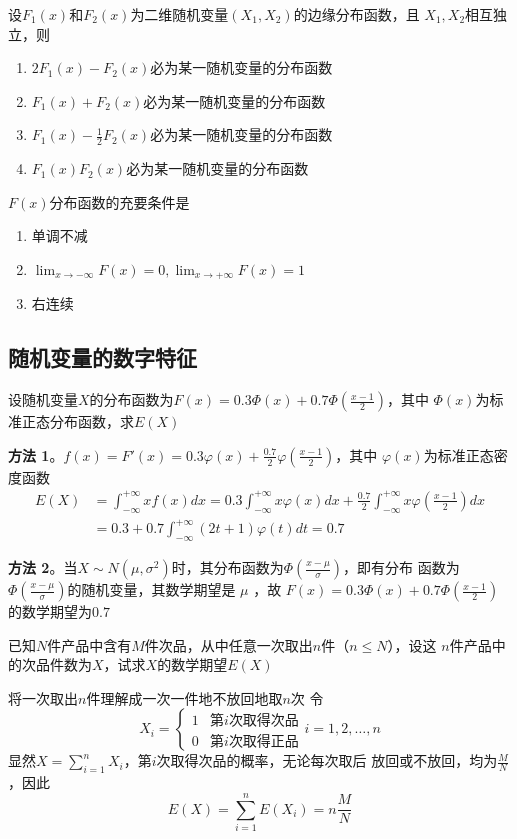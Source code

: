 \documentclass{article}
\begin{document}
\begin{examplle}[]
设\(F_1(x)\)和\(F_2(x)\)为二维随机变量\((X_1,X_2)\)的边缘分布函数，且
\(X_1,X_2\)相互独立，则
\begin{enumerate}
\item \(2F_1(x)-F_2(x)\)必为某一随机变量的分布函数
\item \(F_1(x)+F_2(x)\)必为某一随机变量的分布函数
\item \(F_1(x)-\frac{1}{2}F_2(x)\)必为某一随机变量的分布函数
\item \(F_1(x)F_2(x)\)必为某一随机变量的分布函数
\end{enumerate}


\(F(x)\)分布函数的充要条件是
\begin{enumerate}
\item 单调不减
\item \(\displaystyle\lim_{x\to-\infty}F(x)=0,\lim_{x\to+\infty}F(x)=1\)
\item 右连续
\end{enumerate}
\end{examplle}
\subsection{随机变量的数字特征}
\label{sec:org4b4920e}
\begin{examplle}[]
设随机变量\(X\)的分布函数为\(F(x)=0.3\Phi(x)+0.7\Phi(\frac{x-1}{2})\)，其中
\(\Phi(x)\)为标准正态分布函数，求\(E(X)\)

\textbf{方法 1}。\(f(x)=F'(x)=0.3\varphi(x)+\frac{0.7}{2}\varphi(\frac{x-1}{2})\)，其中
 \(\varphi(x)\)为标准正态密度函数
\begin{align*}
E(X)&=\int_{-\infty}^{+\infty}xf(x)dx=0.3\int_{-\infty}^{+\infty}x\varphi(x)dx+
\frac{0.7}{2}\int_{-\infty}^{+\infty}x\varphi(\frac{x-1}{2})dx\\
&=0.3+0.7\int_{-\infty}^{+\infty}(2t+1)\varphi(t)dt=0.7
\end{align*}

\textbf{方法 2}。当\(X\sim N(\mu,\sigma^2)\)时，其分布函数为\(\Phi(\frac{x-\mu}{\sigma})\)，即有分布
 函数为\(\Phi(\frac{x-\mu}{\sigma})\)的随机变量，其数学期望是 \(\mu\) ，故
 \(F(x)=0.3\Phi(x)+0.7\Phi(\frac{x-1}{2})\)的数学期望为\(0.7\)
\end{examplle}

\begin{examplle}[]
已知\(N\)件产品中含有\(M\)件次品，从中任意一次取出\(n\)件（\(n\le N\)），设这
\(n\)件产品中的次品件数为\(X\)，试求\(X\)的数学期望\(E(X)\)

将一次取出\(n\)件理解成一次一件地不放回地取\(n\)次
令
\begin{equation*}
X_i=
\begin{cases}
1&\text{第$i$次取得次品}\\
0&\text{第$i$次取得正品}
\end{cases}
i=1,2,\dots,n
\end{equation*}
显然\(X=\displaystyle\sum_{i=1}^nX_i\)，第\(i\)次取得次品的概率，无论每次取后
放回或不放回，均为\(\frac{M}{N}\)，因此
\begin{equation*}
E(X)=\sum_{i=1}^nE(X_i)=n\frac{M}{N}
\end{equation*}
\end{examplle}
\end{document}

